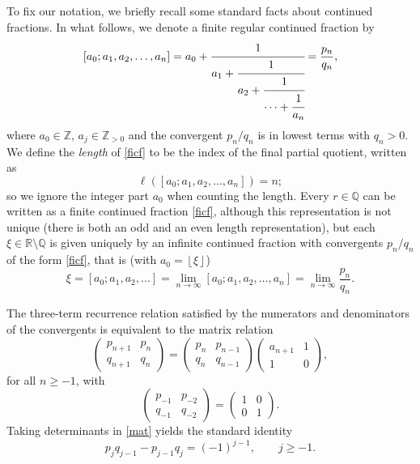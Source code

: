 \documentclass[12pt,a4paper]{amsart}
\theoremstyle{definition}
\numberwithin{equation}{section}
\newcommand{\Z}{\mathbb{Z}}
\newcommand{\Zp}{\mathbb{Z}_{>0}}
\newcommand{\Q}{\mathbb{Q}}
\newcommand{\R}{\mathbb{R}}
\begin{document}
To fix our notation, we briefly recall some standard facts about continued fractions. 
In what follows, we denote a finite regular continued fraction by 
\begin{equation}
\label{ficf}
  [a_0;a_1,a_2,\dots,a_n] 
  = a_0 + \cfrac{1}{ a_1 + \cfrac{1}{ a_2 + \cfrac{1}{ \cdots +\cfrac{1}{a_n}} } }
  = \frac{p_n}{q_n},
\end{equation}
where $a_0 \in \Z$, $a_j \in \Zp$ and the convergent $p_n/q_n$ is in lowest terms with $q_n>0$. 
We define the \textit{length} of \eqref{ficf} to be the index of the final partial quotient, 
written as 
\[ 
\ell (  [a_0;a_1,a_2,\dots,a_n] ) = n; 
\] 
so we ignore the integer part $a_0$ when counting the length.
Every $r\in\Q$ 
can be written as a finite continued fraction \eqref{ficf}, although 
this representation is not unique (there is both an odd and an even length representation), 
but each $\xi\in\R\setminus\Q$ 
is given uniquely by an infinite continued fraction with convergents $p_n/q_n$ 
of the form \eqref{ficf}, that is (with $a_0=\left \lfloor{\xi}\right \rfloor $) 
\begin{equation}
\label{al}
\xi = 
  [a_0;a_1,a_2,\dots] = \lim_{n\to\infty} [a_0;a_1,a_2,\dots,a_n] = \lim_{n\to\infty}\frac{p_n}{q_n}.
\end{equation} 

The three-term recurrence relation satisfied by the numerators and denominators of the convergents 
is equivalent to the matrix relation 
\begin{equation}
\label{mat} 
\begin{pmatrix} 
p_{n+1} & p_n \\ 
q_{n+1} & q_n 
\end{pmatrix} 
= 
\begin{pmatrix}
p_n & p_{n-1}\\ 
q_n & q_{n-1}
\end{pmatrix}
\begin{pmatrix} 
a_{n+1} & 1 \\ 
1 & 0
\end{pmatrix}, 
\end{equation} 
for all $n\geq -1$, with
\[ 
\begin{pmatrix}
p_{-1} & p_{-2} \\ 
q_{-1} & q_{-2} 
\end{pmatrix} 
= \begin{pmatrix} 
1 & 0 \\ 
0 & 1
\end{pmatrix}.
\]
Taking determinants in \eqref{mat} yields the standard 
identity 
\begin{equation}
\label{detid} 
  p_j q_{j-1} - p_{j-1} q_j = (-1)^{j-1}, \qquad j \ge -1. 
\end{equation} 
\end{document}
